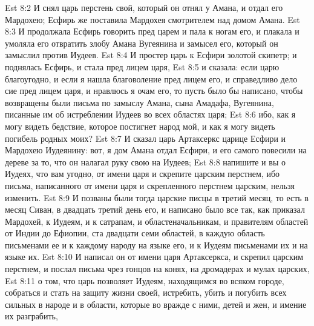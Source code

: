 \vs Est 8:2 И снял царь перстень свой, который он отнял у Амана, и отдал его Мардохею; Есфирь же поставила Мардохея смотрителем над домом Амана.
\vs Est 8:3 И продолжала Есфирь говорить пред царем и пала к ногам его, и плакала и умоляла его отвратить злобу Амана Вугеянина и замысел его, который он замыслил против Иудеев.
\vs Est 8:4 И простер царь к Есфири золотой скипетр; и поднялась Есфирь, и стала пред лицем царя,
\vs Est 8:5 и сказала: если царю благоугодно, и если я нашла благоволение пред лицем его, и справедливо дело сие пред лицем царя, и нравлюсь я очам его, то пусть было бы написано, чтобы возвращены были письма по замыслу Амана, сына Амадафа, Вугеянина, писанные им об истреблении Иудеев во всех областях царя;
\vs Est 8:6 ибо, как я могу видеть бедствие, которое постигнет народ мой, и как я могу видеть погибель родных моих?
\vs Est 8:7 И сказал царь Артаксеркс царице Есфири и Мардохею Иудеянину: вот, я дом Амана отдал Есфири, и его самого повесили на дереве за то, что он налагал руку свою на Иудеев;
\vs Est 8:8 напишите и вы о Иудеях, что вам угодно, от имени царя и скрепите царским перстнем, ибо письма, написанного от имени царя и скрепленного перстнем царским, нельзя изменить.
\rsbpar\vs Est 8:9 И позваны были тогда царские писцы в третий месяц, то есть в месяц Сиван, в двадцать третий день его, и написано было все так, как приказал Мардохей, к Иудеям, и к сатрапам, и областеначальникам, и правителям областей от Индии до Ефиопии, ста двадцати семи областей, в каждую область письменами ее и к каждому народу на языке его, и к Иудеям письменами их и на языке их.
\vs Est 8:10 И написал он от имени царя Артаксеркса, и скрепил царским перстнем, и послал письма чрез гонцов на конях, на дромадерах и мулах царских,
\vs Est 8:11 о том, что царь позволяет Иудеям, находящимся во всяком городе, собраться и стать на защиту жизни своей, истребить, убить и погубить всех сильных в народе и в области, которые во вражде с ними, детей и жен, и имение их разграбить,
